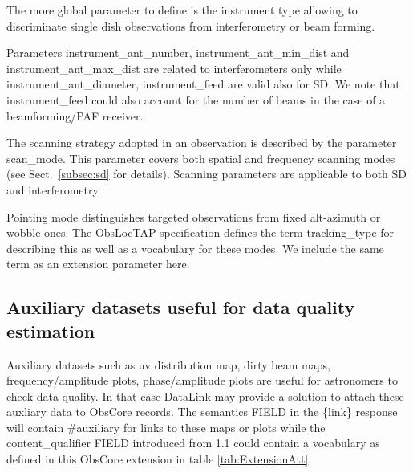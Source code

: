 \documentclass[11pt,a4paper]{ivoa}
\begin{document}
The more global parameter to define is the instrument type allowing to discriminate single dish observations from interferometry or beam forming.

Parameters instrument\_ant\_number, instrument\_ant\_min\_dist and instrument\_ant\_max\_dist are related to interferometers only while instrument\_ant\_diameter, instrument\_feed are valid also for SD.
We note that instrument\_feed could also  account for the number of beams in the case of a beamforming/PAF receiver.

The scanning strategy adopted in an observation is described by the parameter scan\_mode. This parameter covers both spatial and frequency scanning modes (see Sect.~\ref{subsec:sd} for details).
Scanning parameters are applicable to both SD and interferometry.

Pointing mode distinguishes targeted observations from  fixed alt-azimuth or wobble ones. The ObsLocTAP specification \citep{2021ivoa.spec.0724S} defines the term tracking\_type for describing this as well as a  vocabulary for these modes. We include the same term as an extension parameter here.


\subsection{Auxiliary datasets useful for data quality estimation}

Auxiliary datasets such as  uv distribution map, dirty beam maps, frequency/amplitude plots, phase/amplitude plots are useful for astronomers to check data quality.
In that case DataLink \citep{2015ivoa.spec.0617D} may provide a solution to attach these auxliary data to ObsCore records. The semantics FIELD in the \{link\} response  will contain \#auxiliary  for links to these maps or plots while  the content\_qualifier FIELD introduced from 1.1  could contain a vocabulary as defined in this ObsCore extension in table \ref{tab:ExtensionAtt}.
\end{document}

